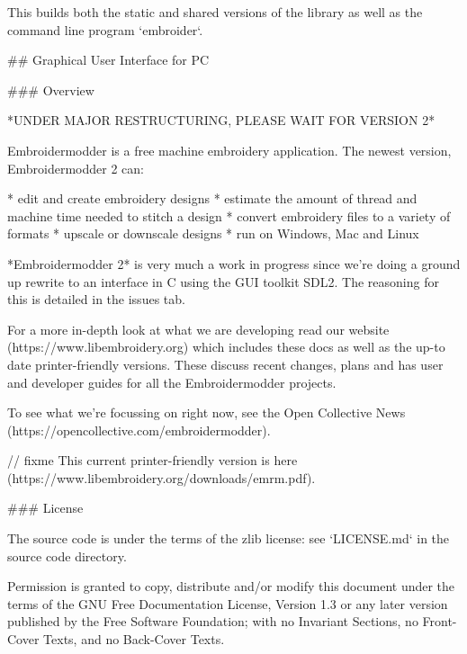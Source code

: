 %

This builds both the static and shared versions of the library as well
as the command line program `embroider`.

\citep{packard1992pcl}
\citep{linuxcncsrc}
\citep{linuxcnc}
\citep{adobe1990postscript}
\citep{postscript1999postscript}
\citep{eduTechDST}
\citep{cups}
\citep{millOperatorsManual}
\citep{oberg1914machinery}
\citep{dxf_reference}
\citep{embroidermodder_source_code}
\citep{libembroidery_source_code}
\citep{acatina}
\citep{kde_tajima}
\citep{wotsit_archive}
\citep{wotsit_siterip}
\citep{fineemb_dst}
\citep{edutechwiki_dst}

## Graphical User Interface for PC

\label{GUI}

### Overview

*UNDER MAJOR RESTRUCTURING, PLEASE WAIT FOR VERSION 2*

Embroidermodder is a free machine embroidery application.
The newest version, Embroidermodder 2 can:

* edit and create embroidery designs
* estimate the amount of thread and machine time needed to stitch a design
* convert embroidery files to a variety of formats
* upscale or downscale designs
* run on Windows, Mac and Linux

*Embroidermodder 2* is very much a work in progress since we're doing a ground
up rewrite to an interface in C using the GUI toolkit SDL2.
The reasoning for this is detailed in the issues tab.

For a more in-depth look at what we are developing read our
website (https://www.libembroidery.org) which includes these docs as well
as the up-to date printer-friendly versions. These discuss recent changes,
plans and has user and developer guides for all the Embroidermodder projects.

To see what we're focussing on right now, see the Open Collective
News (https://opencollective.com/embroidermodder).

// fixme
This current printer-friendly version
is here (https://www.libembroidery.org/downloads/emrm.pdf).

### License

The source code is under the terms of the zlib license: see `LICENSE.md`
in the source code directory.

Permission is granted to copy, distribute and/or modify this document
under the terms of the GNU Free Documentation License, Version 1.3
or any later version published by the Free Software Foundation;
with no Invariant Sections, no Front-Cover Texts, and no Back-Cover Texts.

